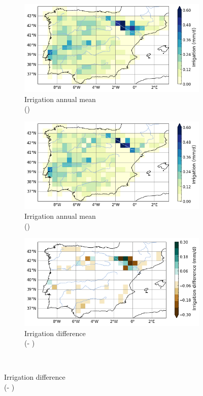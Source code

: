 \begin{figure}[htbp]
    \centering
    \begin{subfigure}[b]{0.32\textwidth}
        \caption{Irrigation annual mean\\(\std)}
        \includegraphics[width=\textwidth]{images/chap3/maps/irrigation_subgrid.png}
    \end{subfigure}
    \begin{subfigure}[b]{0.32\textwidth}
        \caption{Irrigation annual mean\\(\native)}
        \includegraphics[width=\textwidth]{images/chap3/maps/irrigation_interp.png}
    \end{subfigure}
    \begin{subfigure}[b]{0.32\textwidth}
        \caption{Irrigation difference\\(\native - \std)}
        \includegraphics[width=\textwidth]{images/chap3/maps/irrigation_diff.png}
    \end{subfigure} \\


\end{figure}
